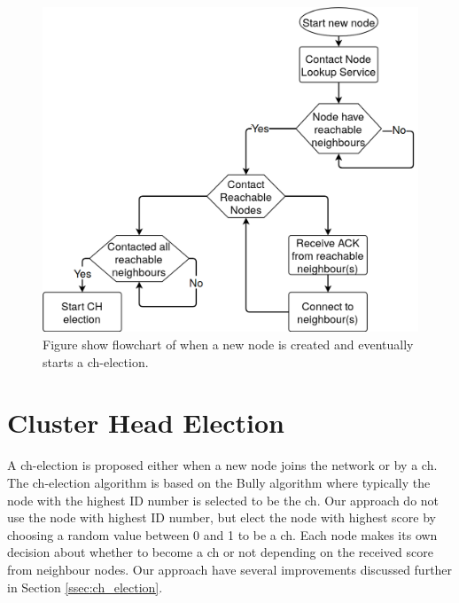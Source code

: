 \documentclass[USenglish]{uit-thesis}
\begin{document}
\begin{figure}
\centering
\includegraphics[scale=0.28]{newNodeChart2.png}
\caption{Figure show flowchart of when a new node is created and eventually starts a \gls{ch}-election.}
\label{fig:newNodeChart2}
\end{figure}



\section{Cluster Head Election} \label{imp:ch_election}


A \gls{ch}-election is proposed either when a new node joins the network or by a \gls{ch}. 
The \gls{ch}-election algorithm is based on the Bully algorithm \cite{bully} where typically the node with the highest ID number is selected to be the \gls{ch}. Our approach do not use the node with highest ID number, but elect the node with highest score by choosing a random value between $0$ and 1 to be a \gls{ch}. Each node makes its own decision about whether to become a \gls{ch} or not depending on the received score from neighbour nodes.
Our approach have several improvements discussed further in Section \ref{ssec:ch_election}. 
\end{document}
